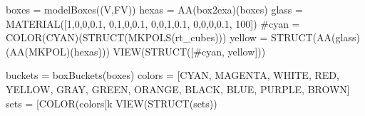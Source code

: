 boxes = modelBoxes((V,FV))
hexas = AA(box2exa)(boxes)
glass = MATERIAL([1,0,0,0.1,  0,1,0,0.1,  0,0,1,0.1, 0,0,0,0.1, 100])
#cyan = COLOR(CYAN)(STRUCT(MKPOLS(rt_cubes)))
yellow = STRUCT(AA(glass)(AA(MKPOL)(hexas)))
VIEW(STRUCT([#cyan,
	yellow]))

buckets = boxBuckets(boxes)
colors = [CYAN, MAGENTA, WHITE, RED, YELLOW, GRAY, GREEN, ORANGE, BLACK, BLUE, PURPLE, BROWN]
sets = [COLOR(colors[k%
VIEW(STRUCT(sets))


